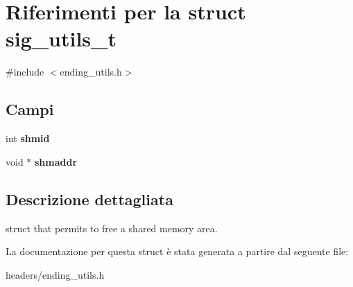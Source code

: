\hypertarget{structsig__utils__t}{}\section{Riferimenti per la struct sig\+\_\+utils\+\_\+t}
\label{structsig__utils__t}


{\ttfamily \#include $<$ending\+\_\+utils.\+h$>$}

\subsection*{Campi}
\begin{DoxyCompactItemize}
\item 
\mbox{\label{structsig__utils__t_afbc9ea086ea2fc38ef5c002630e10535}} 
int {\bfseries shmid}
\item 
\mbox{\label{structsig__utils__t_aae4e940427ea675c27428161fbc1ea43}} 
void $\ast$ {\bfseries shmaddr}
\end{DoxyCompactItemize}


\subsection{Descrizione dettagliata}
struct that permits to free a shared memory area. 

La documentazione per questa struct è stata generata a partire dal seguente file\+:\begin{DoxyCompactItemize}
\item 
headers/ending\+\_\+utils.\+h\end{DoxyCompactItemize}
